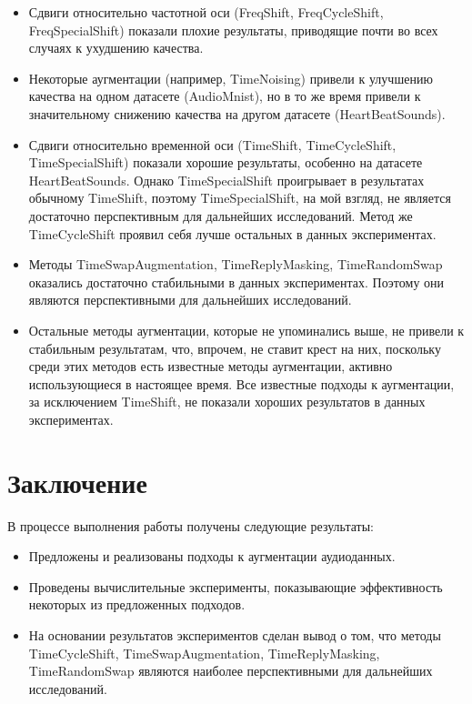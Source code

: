 \documentclass[12pt, fleqn]{article}
\begin{document}
	\begin{itemize}
		\item Сдвиги относительно частотной оси (FreqShift, FreqCycleShift, FreqSpecialShift) показали плохие результаты, приводящие почти во всех случаях к ухудшению качества.
		\item Некоторые аугментации (например, TimeNoising) привели к улучшению качества на одном датасете (AudioMnist), но в то же время привели к значительному снижению качества на другом датасете (HeartBeatSounds).
		\item Сдвиги относительно временной оси (TimeShift, TimeCycleShift, TimeSpecialShift) показали хорошие результаты, особенно на датасете HeartBeatSounds. Однако TimeSpecialShift проигрывает в результатах обычному TimeShift, поэтому TimeSpecialShift, на мой взгляд, не является достаточно перспективным для дальнейших исследований. Метод же TimeCycleShift проявил себя лучше остальных в данных экспериментах.
		\item Методы TimeSwapAugmentation, TimeReplyMasking, TimeRandomSwap оказались достаточно стабильными в данных экспериментах. Поэтому они являются перспективными для дальнейших исследований.
		\item Остальные методы аугментации, которые не упоминались выше, не привели к стабильным результатам, что, впрочем, не ставит крест на них, поскольку среди этих методов есть известные методы аугментации, активно использующиеся в настоящее время. Все известные подходы к аугментации, за исключением TimeShift, не показали хороших результатов в данных экспериментах.
	\end{itemize}
	
	\section{Заключение}
	
	В процессе выполнения работы получены следующие результаты:
	\begin{itemize}
		\item Предложены и реализованы подходы к аугментации аудиоданных.
		\item Проведены вычислительные эксперименты, показывающие эффективность некоторых из предложенных подходов.
		\item На основании результатов экспериментов сделан вывод о том, что методы TimeCycleShift, TimeSwapAugmentation, TimeReplyMasking, TimeRandomSwap являются наиболее перспективными для дальнейших исследований.
	\end{itemize}
\newpage
\end{document}
